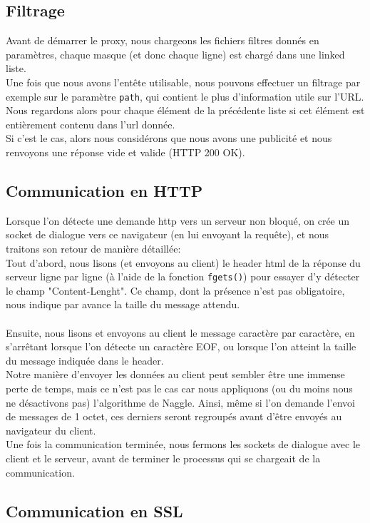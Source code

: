 \documentclass{scrreprt}
\def\code#1{\texttt{#1}}
\begin{document}
\subsection{Filtrage}
Avant de démarrer le proxy, nous chargeons les fichiers filtres donnés en paramètres, chaque masque (et donc chaque ligne) est chargé dans une linked liste.\\
Une fois que nous avons l'entête utilisable, nous pouvons effectuer un filtrage par exemple sur le paramètre \code{path}, qui contient le plus d'information utile sur l'URL. Nous regardons alors pour chaque élément de la précédente liste si cet élément est entièrement contenu dans l'url donnée.\\
Si c'est le cas, alors nous considérons que nous avons une publicité et nous renvoyons une réponse vide et valide (HTTP 200 OK).


\subsection{Communication en HTTP}

Lorsque l'on détecte une demande http vers un serveur non bloqué, on crée un socket de dialogue vers ce navigateur (en lui envoyant la requête), et nous traitons son retour de manière détaillée:\\
Tout d'abord, nous lisons (et envoyons au client) le header html de la réponse du serveur ligne par ligne (à l'aide de la fonction \code{fgets()}) pour essayer d'y détecter le champ "Content-Lenght". Ce champ, dont la présence n'est pas obligatoire, nous indique par avance la taille du message attendu.\\\\
Ensuite, nous lisons et envoyons au client le message caractère par caractère, en s'arrêtant lorsque l'on détecte un caractère EOF, ou lorsque l'on atteint la taille du message indiquée dans le header.\\
Notre manière d'envoyer les données au client peut sembler être une immense perte de temps, mais ce n'est pas le cas car nous appliquons (ou du moins nous ne désactivons pas) l'algorithme de Naggle. Ainsi, même si l'on demande l'envoi de messages de 1 octet, ces derniers seront regroupés avant d'être envoyés au navigateur du client.\\
Une fois la communication terminée, nous fermons les sockets de dialogue avec le client et le serveur, avant de terminer le processus qui se chargeait de la communication.
\subsection{Communication en SSL}
\end{document}
